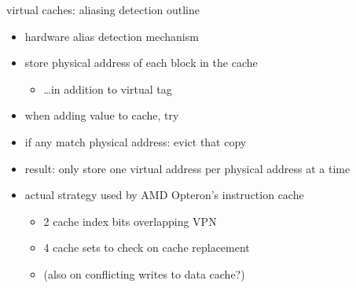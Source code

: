 \begin{frame}{virtual caches: aliasing detection outline}
    \begin{itemize}
    \item hardware alias detection mechanism
    \vspace{.5cm}
    \item store physical address of each block in the cache
        \begin{itemize}
            \item \ldots in addition to virtual tag
        \end{itemize}
    \item when adding value to cache, try 
    \item if any match physical address: evict that copy
    \item result: only store one virtual address per physical address at a time
    \item actual strategy used by AMD Opteron's instruction cache
        \begin{itemize}
        \item 2 cache index bits overlapping VPN
        \item 4 cache sets to check on cache replacement
        \item (also on conflicting writes to data cache?)
        \end{itemize}
    \end{itemize}
\end{frame}
